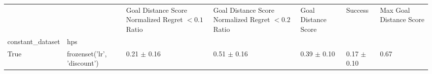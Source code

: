 \begin{tabular}{lllllll}
\toprule
 &  & Goal Distance Score Normalized Regret $< 0.1$ Ratio & Goal Distance Score Normalized Regret $< 0.2$ Ratio & Goal Distance Score & Success & Max Goal Distance Score \\
constant_dataset & hps &  &  &  &  &  \\
\midrule
True & frozenset({'lr', 'discount'}) & 0.21 $\pm$ 0.16 & 0.51 $\pm$ 0.16 & 0.39 $\pm$ 0.10 & 0.17 $\pm$ 0.10 & 0.67 \\
\cline{1-7}
\bottomrule
\end{tabular}
